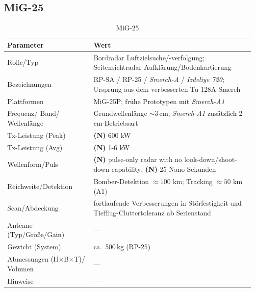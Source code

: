 \subsection{MiG-25 \parencite{MiGAlley_Smerch}}
\begin{table}[h]
\centering
\renewcommand{\arraystretch}{1.15}
\begin{tabular}{p{3.9cm} p{10.7cm}}
\hline
\textbf{Parameter} & \textbf{Wert} \\
\hline
Rolle/Typ & Bordradar Luftzielsuche/-verfolgung; Seitensichtradar Aufklärung/Bodenkartierung \\
Bezeichnungen & RP-SA / RP-25 / \emph{Smerch-A} / \emph{Izdeliye 720}; Ursprung aus dem verbesserten Tu-128A-Smerch \\
Plattformen & MiG-25P; frühe Prototypen mit \emph{Smerch-A1} \\
Frequenz/ Band/ Wellenlänge & Grundwellenlänge \(\sim\)3\,cm; \emph{Smerch-A1} zusätzlich 2\,cm-Betriebsart \\
Tx-Leistung (Peak) & \textbf{(N)} 600 kW \\
Tx-Leistung (Avg) & \textbf{(N)} 1-6 kW \\
Wellenform/Puls & \textbf{(N)} pulse-only radar with no look-down/shoot-down capability; \textbf{(N)} 25 Nano Sekunden \\
Reichweite/Detektion & Bomber-Detektion \(\approx 100\) km; Tracking \(\approx 50\) km (A1) \\
Scan/Abdeckung & fortlaufende Verbesserungen in Störfestigkeit und Tiefflug-Cluttertoleranz ab Serienstand \\
Antenne (Typ/Größe/Gain) & --- \\
Gewicht (System) & ca.\ 500\,kg (RP-25) \\
Abmessungen (H\(\times\)B\(\times\)T)/ Volumen & --- \\
Hinweise & --- \\
\hline
\end{tabular}
\caption{MiG-25}
\end{table}

